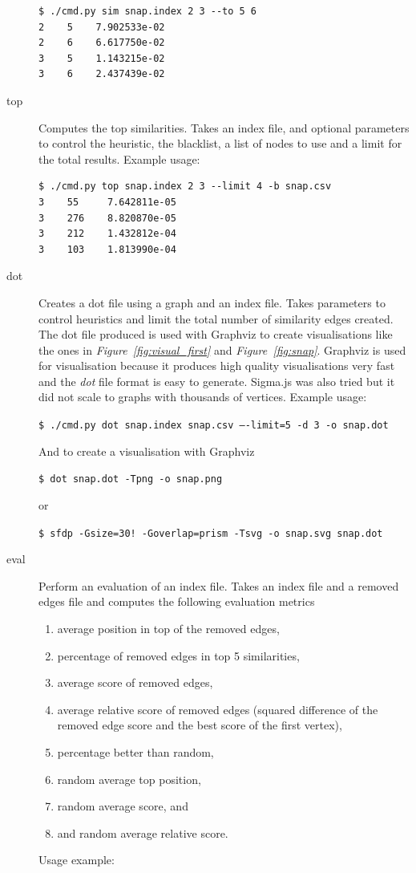 \documentclass[12pt]{report}
\begin{document}
\begin{description}
    \begin{lstlisting}
$ ./cmd.py sim snap.index 2 3 --to 5 6
2    5    7.902533e-02
2    6    6.617750e-02
3    5    1.143215e-02
3    6    2.437439e-02
    \end{lstlisting}
  \item[top] Computes the top similarities. Takes an index file, and optional
  parameters to control the heuristic, the blacklist, a list of nodes to use and
  a limit for the total results. Example usage:
  \begin{lstlisting}
$ ./cmd.py top snap.index 2 3 --limit 4 -b snap.csv
3    55     7.642811e-05
3    276    8.820870e-05
3    212    1.432812e-04
3    103    1.813990e-04
  \end{lstlisting}
  \item[dot] Creates a dot file using a graph and an index file. Takes parameters
  to control heuristics and limit the total number of similarity edges created.
  The dot file produced is used with Graphviz \cite{graphviz} to create
  visualisations like the ones in \emph{Figure~\ref{fig:visual_first}} and
  \emph{Figure~{\ref{fig:snap}}}. Graphviz is used for visualisation because it
  produces high quality visualisations very fast and the \emph{dot} file format
  is easy to generate. Sigma.js \cite{sigmajs} was also tried but it did not
  scale to graphs with thousands of vertices. Example usage:

  {\tt \$ ./cmd.py dot snap.index snap.csv ----limit=5 -d 3 -o snap.dot}

  And to create a visualisation with Graphviz

  {\tt \$ dot snap.dot -Tpng -o snap.png}

  or

  {\tt \$ sfdp -Gsize=30! -Goverlap=prism -Tsvg -o snap.svg snap.dot}
  \item[eval] Perform an evaluation of an index file. Takes an index file and
  a removed edges file and computes the following evaluation metrics
  \begin{enumerate}
    \item average position in top of the removed edges,
    \item percentage of removed edges in top 5 similarities,
    \item average score of removed edges,
    \item average relative score of removed edges (squared difference of the
      removed edge score and the best score of the first vertex),
    \item percentage better than random,
    \item random average top position,
    \item random average score, and
    \item and random average relative score.
  \end{enumerate}
  Usage example:


\end{description}
\end{document}
